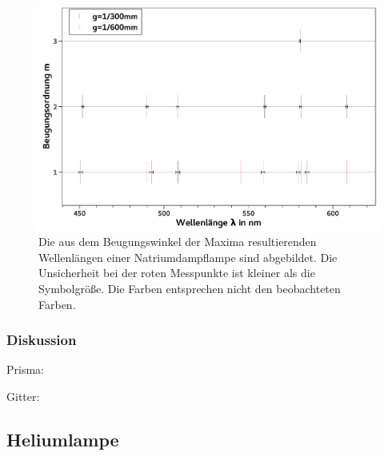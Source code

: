 \documentclass[
	a4paper,
	12pt,
	pagesize,
	ngerman
]{scrartcl}
\begin{document}
	\begin{figure}[H] 
		\includegraphics[width=1\textwidth]{fig_natrium}  %
		\centering
		\caption{Die aus dem Beugungswinkel der Maxima resultierenden Wellenlängen einer Natriumdampflampe sind abgebildet.
		Die Unsicherheit bei der roten Messpunkte ist kleiner als die Symbolgröße.
		Die Farben entsprechen nicht den beobachteten Farben.
		}
		\label{fig_natrium}
		\centering
	\end{figure}

	\subsubsection{Diskussion}
	Prisma:
	
	Gitter:
	
	\subsection{Heliumlampe} \label{ss_helium}
\end{document}
